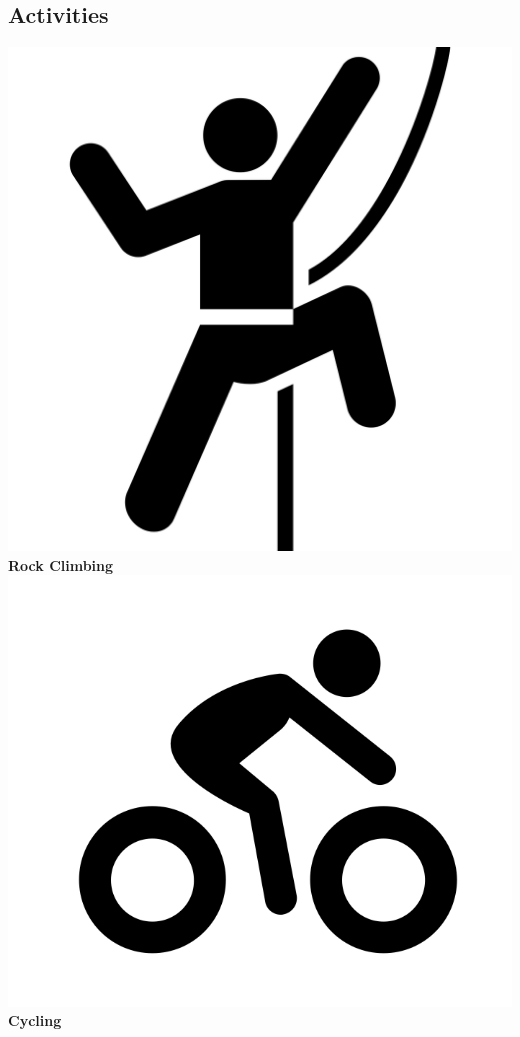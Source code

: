 \documentclass[]{friggeri-cv}
\begin{document}
\begin{aside}
  \section{Activities}
    \includegraphics[scale=0.03]{img/climbing.png}
    \textbf{Rock Climbing}
        \includegraphics[scale=0.05]{img/cycling.png}
    \textbf{Cycling}

\end{aside}
\end{document}
